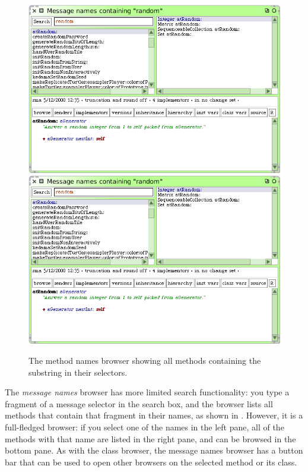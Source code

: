 \documentclass[a4paper,10pt,twoside]{book}
\begin{document}
\begin{figure}[btp]
	\begin{center}
	\ifluluelse
		{\includegraphics[width=\textwidth]{methodNamesRandom}}
		{\includegraphics[scale=0.7]{methodNamesRandom}}
	\end{center}
	\caption{The method names browser showing all methods containing the substring  in their selectors.}
	\label{fig:methodNamesRandom}
\end{figure}

The \emph{message names} browser has more limited search functionality: you type a fragment of a message selector in the search box, and the browser lists all methods that contain that fragment in their names, as shown in .
However, it is a full-fledged browser:
if you select one of the names in the left pane, all of the methods with that name are listed in the right pane, and can be browsed in the bottom pane.
As with the class browser, the message names browser has a button bar that can be used to open other  browsers on the selected method or its class.
\end{document}
